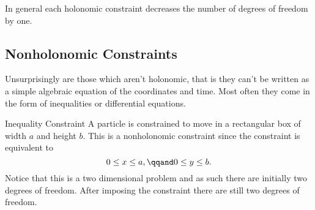 \documentclass[fleqn]{NotesClass}
\begin{document}
    In general each holonomic constraint decreases the number of degrees of freedom by one.
    
    \subsection{Nonholonomic Constraints}
    Unsurprisingly  are those which aren't holonomic, that is they can't be written as a simple algebraic equation of the coordinates and time.
    Most often they come in the form of inequalities or differential equations.
    
    \begin{exm}{Inequality Constraint}{}
        A particle is constrained to move in a rectangular box of width \(a\) and height \(b\).
        This is a nonholonomic constraint since the constraint is equivalent to
        \begin{equation}
            0 \le x \le a, \qqand 0 \le y \le b.
        \end{equation}
        Notice that this is a two dimensional problem and as such there are initially two degrees of freedom.
        After imposing the constraint there are still two degrees of freedom.
    \end{exm}
    
\end{document}
